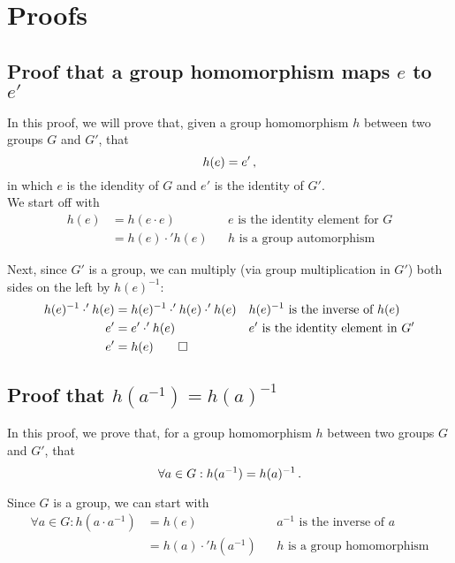 \section{Proofs}
    \subsection{Proof that a group homomorphism maps $e$ to $e'$} \label{app:proof_hom_id}
        In this proof, we will prove that, given a group homomorphism $h$ between two groups $G$ and $G'$, that
        \begin{equation}
            h(e) = e' \thinspace ,
        \end{equation}
        in which $e$ is the idendity of $G$ and $e'$ is the identity of $G'$. \\

        We start off with
        \begin{align}
            h(e) &= h(e \cdot e)        && \text{$e$ is the identity element for $G$} \\
            &= h(e) \cdot' h(e)         && \text{$h$ is a group automorphism}
        \end{align}

        Next, since $G'$ is a group, we can multiply (via group multiplication in $G'$) both sides on the left by $h(e)^{-1}$:
        \begin{align}
            h(e)^{-1} \cdot' h(e) &= h(e)^{-1} \cdot' h(e) \cdot' h(e)      && \text{$h(e)^{-1}$ is the inverse of $h(e)$} \\
            e' &= e' \cdot' h(e)                                            && \text{$e'$ is the identity element in $G'$} \\
            e' &= h(e) \qed
        \end{align}

    \subsection{Proof that $h(a^{-1}) = h(a)^{-1}$} \label{app:proof_hom_inv}
        In this proof, we prove that, for a group homomorphism $h$ between two groups $G$ and $G'$, that
        \begin{equation}
            \forall a \in G: h(a^{-1}) = h(a)^{-1} \thinspace .
        \end{equation}

        Since $G$ is a group, we can start with
        \begin{align}
            \forall a \in G: h(a \cdot a^{-1}) &= h(e)      && \text{$a^{-1}$ is the inverse of $a$} \\
            &= h(a) \cdot' h(a^{-1})                        && \text{$h$ is a group homomorphism} \label{eq:hom_inv_1}
        \end{align}

